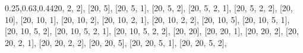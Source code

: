 \documentclass[
  paper=a4,
  ,captions=tableheading
]{scrartcl}
\newenvironment{Shaded}{}{}
\newcommand{\DecValTok}[1]{\textcolor[rgb]{0.25,0.63,0.44}{#1}}
\newcommand{\NormalTok}[1]{#1}
\begin{document}
\begin{Shaded}
\begin{Highlighting}[]
\NormalTok{    [}\DecValTok{20}\NormalTok{, }\DecValTok{2}\NormalTok{, }\DecValTok{2}\NormalTok{],}
\NormalTok{    [}\DecValTok{20}\NormalTok{, }\DecValTok{5}\NormalTok{],}
\NormalTok{    [}\DecValTok{20}\NormalTok{, }\DecValTok{5}\NormalTok{, }\DecValTok{1}\NormalTok{],}
\NormalTok{    [}\DecValTok{20}\NormalTok{, }\DecValTok{5}\NormalTok{, }\DecValTok{2}\NormalTok{],}
\NormalTok{    [}\DecValTok{20}\NormalTok{, }\DecValTok{5}\NormalTok{, }\DecValTok{2}\NormalTok{, }\DecValTok{1}\NormalTok{],}
\NormalTok{    [}\DecValTok{20}\NormalTok{, }\DecValTok{5}\NormalTok{, }\DecValTok{2}\NormalTok{, }\DecValTok{2}\NormalTok{],}
\NormalTok{    [}\DecValTok{20}\NormalTok{, }\DecValTok{10}\NormalTok{],}
\NormalTok{    [}\DecValTok{20}\NormalTok{, }\DecValTok{10}\NormalTok{, }\DecValTok{1}\NormalTok{],}
\NormalTok{    [}\DecValTok{20}\NormalTok{, }\DecValTok{10}\NormalTok{, }\DecValTok{2}\NormalTok{],}
\NormalTok{    [}\DecValTok{20}\NormalTok{, }\DecValTok{10}\NormalTok{, }\DecValTok{2}\NormalTok{, }\DecValTok{1}\NormalTok{],}
\NormalTok{    [}\DecValTok{20}\NormalTok{, }\DecValTok{10}\NormalTok{, }\DecValTok{2}\NormalTok{, }\DecValTok{2}\NormalTok{],}
\NormalTok{    [}\DecValTok{20}\NormalTok{, }\DecValTok{10}\NormalTok{, }\DecValTok{5}\NormalTok{],}
\NormalTok{    [}\DecValTok{20}\NormalTok{, }\DecValTok{10}\NormalTok{, }\DecValTok{5}\NormalTok{, }\DecValTok{1}\NormalTok{],}
\NormalTok{    [}\DecValTok{20}\NormalTok{, }\DecValTok{10}\NormalTok{, }\DecValTok{5}\NormalTok{, }\DecValTok{2}\NormalTok{],}
\NormalTok{    [}\DecValTok{20}\NormalTok{, }\DecValTok{10}\NormalTok{, }\DecValTok{5}\NormalTok{, }\DecValTok{2}\NormalTok{, }\DecValTok{1}\NormalTok{],}
\NormalTok{    [}\DecValTok{20}\NormalTok{, }\DecValTok{10}\NormalTok{, }\DecValTok{5}\NormalTok{, }\DecValTok{2}\NormalTok{, }\DecValTok{2}\NormalTok{],}
\NormalTok{    [}\DecValTok{20}\NormalTok{, }\DecValTok{20}\NormalTok{],}
\NormalTok{    [}\DecValTok{20}\NormalTok{, }\DecValTok{20}\NormalTok{, }\DecValTok{1}\NormalTok{],}
\NormalTok{    [}\DecValTok{20}\NormalTok{, }\DecValTok{20}\NormalTok{, }\DecValTok{2}\NormalTok{],}
\NormalTok{    [}\DecValTok{20}\NormalTok{, }\DecValTok{20}\NormalTok{, }\DecValTok{2}\NormalTok{, }\DecValTok{1}\NormalTok{],}
\NormalTok{    [}\DecValTok{20}\NormalTok{, }\DecValTok{20}\NormalTok{, }\DecValTok{2}\NormalTok{, }\DecValTok{2}\NormalTok{],}
\NormalTok{    [}\DecValTok{20}\NormalTok{, }\DecValTok{20}\NormalTok{, }\DecValTok{5}\NormalTok{],}
\NormalTok{    [}\DecValTok{20}\NormalTok{, }\DecValTok{20}\NormalTok{, }\DecValTok{5}\NormalTok{, }\DecValTok{1}\NormalTok{],}
\NormalTok{    [}\DecValTok{20}\NormalTok{, }\DecValTok{20}\NormalTok{, }\DecValTok{5}\NormalTok{, }\DecValTok{2}\NormalTok{],}

\end{Highlighting}
\end{Shaded}
\end{document}
